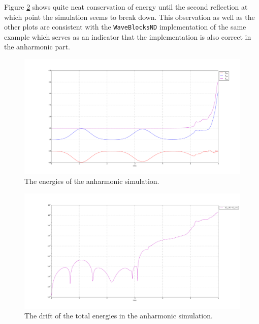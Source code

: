 Figure \ref{fig:anharmonic_drift} shows quite neat conservation of energy until the second reflection at which point the simulation seems to break down. This observation as well as the other plots are consistent with the \texttt{WaveBlocksND} implementation of the same example which serves as an indicator that the implementation is also correct in the anharmonic part.

\begin{figure}
\includegraphics[width=\textwidth]{Figures/anharm_energy.pdf}
\caption{The energies of the anharmonic simulation.}
\label{fig:anharmonic_energy}
\end{figure}

\begin{figure}
\includegraphics[width=\textwidth]{Figures/anharmonic_drift.pdf}
\caption{The drift of the total energies in the anharmonic simulation.}
\label{fig:anharmonic_drift}
\end{figure}

